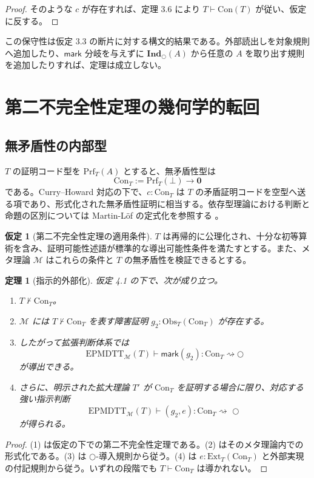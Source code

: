 \documentclass[a4paper,11pt]{ltjsarticle}
\theoremstyle{definition}
\newtheorem{assumption}[definition]{仮定}
\theoremstyle{plain}
\newtheorem{theorem}[definition]{定理}
\newcommand{\dfix}{\bigcirc}
\newcommand{\EPMDTT}{\mathrm{EPMDTT}}
\newcommand{\Obs}{\mathrm{Obs}}
\newcommand{\Ext}{\mathrm{Ext}}
\newcommand{\Prf}{\mathrm{Prf}}
\newcommand{\Con}{\mathrm{Con}}
\newcommand{\Ind}{\mathbf{Ind}_{\dfix}}
\newcommand{\Meta}{\mathcal{M}}
\newcommand{\False}{\mathbf{0}}
\begin{document}
\begin{proof}
そのような $c$ が存在すれば、定理 3.6 により $T\vdash\Con(T)$ が従い、仮定に反する。
\end{proof}

この保守性は仮定 3.3 の断片に対する構文的結果である。外部読出しを対象規則へ追加したり、$\mathsf{mark}$ 分岐を与えずに $\Ind(A)$ から任意の $A$ を取り出す規則を追加したりすれば、定理は成立しない。

\section{第二不完全性定理の幾何学的転回}

\subsection{無矛盾性の内部型}

$T$ の証明コード型を $\Prf_T(A)$ とすると、無矛盾性型は
\[
 \Con_T:=\Prf_T(\bot)\to\False
\]
である。Curry--Howard 対応の下で、$c:\Con_T$ は $T$ の矛盾証明コードを空型へ送る項であり、形式化された無矛盾性証明に相当する。依存型理論における判断と命題の区別については Martin-Löf の定式化を参照する \cite{MartinLof1984}。

\begin{assumption}[第二不完全性定理の適用条件]
$T$ は再帰的に公理化され、十分な初等算術を含み、証明可能性述語が標準的な導出可能性条件を満たすとする。また、メタ理論 $\Meta$ はこれらの条件と $T$ の無矛盾性を検証できるとする。
\end{assumption}

\begin{theorem}[指示的外部化]
仮定 4.1 の下で、次が成り立つ。
\begin{enumerate}
 \item $T\nvdash\Con_T$。
 \item $\Meta$ には $T\nvdash\Con_T$ を表す障害証明 $g_2:\Obs_T(\Con_T)$ が存在する。
 \item したがって拡張判断体系では
 \[
  \EPMDTT_{\Meta}(T)\vdash
  \mathsf{mark}(g_2):\Con_T\rightsquigarrow\dfix
 \]
 が導出できる。
 \item さらに、明示された拡大理論 $T'$ が $\Con_T$ を証明する場合に限り、対応する強い指示判断
 \[
  \EPMDTT_{\Meta}(T)\vdash
  (g_2,e):\Con_T\rightsquigarrow_{\!}\dfix
 \]
 が得られる。
\end{enumerate}
\end{theorem}

\begin{proof}
(1) は仮定の下での第二不完全性定理である。(2) はそのメタ理論内での形式化である。(3) は $\dfix$-導入規則から従う。(4) は $e:\Ext_T(\Con_T)$ と外部実現の付記規則から従う。いずれの段階でも $T\vdash\Con_T$ は導かれない。
\end{proof}
\end{document}
